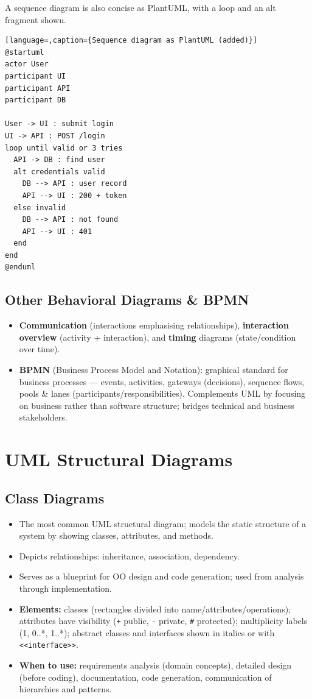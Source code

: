 \documentclass[hidelinks]{article}
\begin{document}
A sequence diagram is also concise as PlantUML, with a loop and an alt fragment shown.
\begin{lstlisting}[language=,caption={Sequence diagram as PlantUML (added)}]
@startuml
actor User
participant UI
participant API
participant DB

User -> UI : submit login
UI -> API : POST /login
loop until valid or 3 tries
  API -> DB : find user
  alt credentials valid
    DB --> API : user record
    API --> UI : 200 + token
  else invalid
    DB --> API : not found
    API --> UI : 401
  end
end
@enduml
\end{lstlisting}

\subsection{Other Behavioral Diagrams \& BPMN}
\begin{itemize}
  \item \textbf{Communication} (interactions emphasising relationships), \textbf{interaction
        overview} (activity + interaction), and \textbf{timing} diagrams (state/condition over time).
  \item \textbf{BPMN} (Business Process Model and Notation): graphical standard for business
        processes --- events, activities, gateways (decisions), sequence flows, pools \& lanes
        (participants/responsibilities). Complements UML by focusing on business rather than
        software structure; bridges technical and business stakeholders.
\end{itemize}


\section{UML Structural Diagrams}

\subsection{Class Diagrams}
\begin{itemize}
  \item The most common UML structural diagram; models the static structure of a system by
        showing classes, attributes, and methods.
  \item Depicts relationships: inheritance, association, dependency.
  \item Serves as a blueprint for OO design and code generation; used from analysis through implementation.
  \item \textbf{Elements:} classes (rectangles divided into name/attributes/operations); attributes have
        visibility (\texttt{+} public, \texttt{-} private, \texttt{\#} protected); multiplicity labels
        (1, 0..*, 1..*); abstract classes and interfaces shown in italics or with \texttt{<{}<interface>{}>}.
  \item \textbf{When to use:} requirements analysis (domain concepts), detailed design (before coding),
        documentation, code generation, communication of hierarchies and patterns.
\end{itemize}
\end{document}
